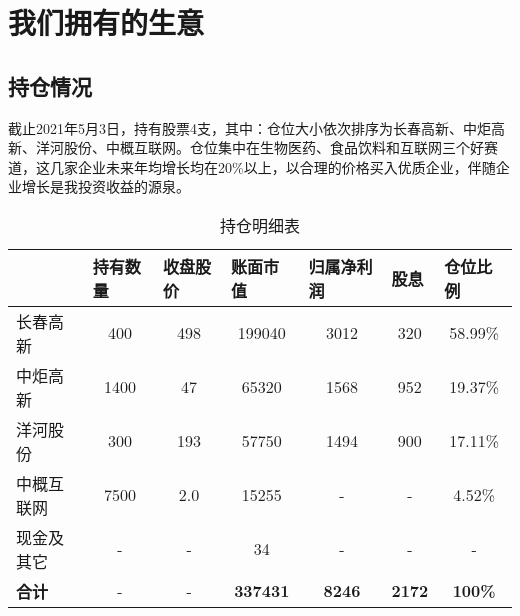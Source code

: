 \documentclass[UTF8,a4paper,12pt,lang=cn,fontset = windows]{elegantpaper} %
\begin{document}
\section{我们拥有的生意}
\subsection{持仓情况}

截止2021年5月3日，持有股票4支，其中：仓位大小依次排序为长春高新、中炬高新、洋河股份、中概互联网。仓位集中在生物医药、食品饮料和互联网三个好赛道，这几家企业未来年均增长均在20\%以上，以合理的价格买入优质企业，伴随企业增长是我投资收益的源泉。

\begin{table}[htbp]
    \centering
	\caption{持仓明细表}
\begin{tabular}{lcccccc}
    \toprule
    \textbf{} & \multicolumn{1}{l}{\textbf{持有数量}} & \multicolumn{1}{l}{\textbf{收盘股价}} & \multicolumn{1}{l}{\textbf{账面市值}} & \multicolumn{1}{l}{\textbf{归属净利润}} & \multicolumn{1}{l}{\textbf{股息}} & \multicolumn{1}{l}{\textbf{仓位比例}} \\
    \midrule
    长春高新      & 400                               & 498                               & 199040                            & 3012                               & 320                             & 58.99\%                           \\
    中炬高新      & 1400                              & 47                                & 65320                             & 1568                               & 952                             & 19.37\%                           \\
    洋河股份      & 300                               & 193                               & 57750                             & 1494                               & 900                             & 17.11\%                           \\
    中概互联网     & 7500                              & 2.0                               & 15255                             & -                                  & -                               & 4.52\%                            \\
    现金及其它     & -                                 & -                                 & 34                             & -                                  & -                               & -                                 \\
    \textbf{合计}        & -                                 & -                                 & \textbf{337431}                            & \textbf{8246}                               & \textbf{2172}                            & \textbf{100\%}                               \\
    \bottomrule
    \end{tabular}
\end{table}
\end{document}
